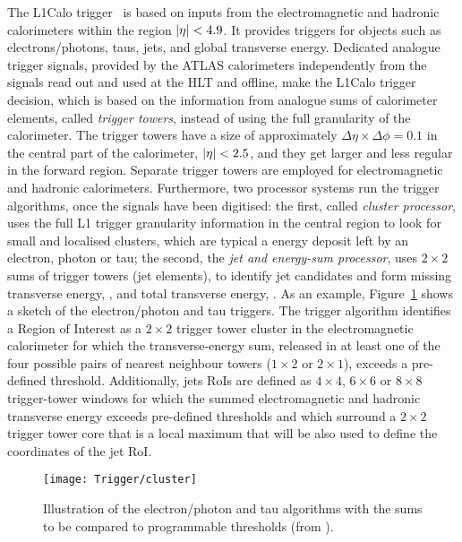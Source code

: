 			The \ac{L1Calo} trigger~\cite{ATLASJINST, ATLASL1CaloTrig} is based on inputs from the electromagnetic and hadronic calorimeters within the region $|\eta|<4.9$. It provides triggers for objects such as electrons/photons, taus, jets, and global transverse energy. Dedicated analogue trigger signals, provided by the \ac{ATLAS} calorimeters independently from the signals read out and used at the \ac{HLT} and offline, make the \ac{L1Calo} trigger decision, which is based on the information from analogue sums of calorimeter elements, called \emph{trigger towers}, instead of using the full granularity of the calorimeter. The trigger towers have a size of approximately $\Delta \eta \times \Delta \phi = 0.1$ in the central part of the calorimeter, $|\eta| < 2.5$, and they get larger and less regular in the forward region. Separate trigger towers are employed for electromagnetic and hadronic calorimeters. Furthermore, two processor systems run the trigger algorithms, once the signals have been digitised: the first, called \emph{cluster processor}, uses the full \ac{L1} trigger granularity information in the central region to look for small and localised clusters, which are typical a energy deposit left by an electron, photon or tau; the second, the \emph{jet and energy-sum processor}, uses $2 \times 2$ sums of trigger towers (jet elements), to identify jet candidates and form missing transverse energy, \met, and total transverse energy, \et. As an example, Figure~\ref{fig:calo_cluster} shows a sketch of the electron/photon and tau triggers. The trigger algorithm identifies a Region of Interest as a $2 \times 2$ trigger tower cluster in the electromagnetic calorimeter for which the transverse-energy sum, released in at least one of the four possible pairs of nearest neighbour towers ($1 \times 2$ or $2 \times 1$), exceeds a pre-defined threshold. Additionally, jets \ac{RoI}s are defined as $4 \times 4$, $6 \times 6$ or $8 \times 8$ trigger-tower windows for which the summed electromagnetic and hadronic transverse energy exceeds pre-defined thresholds and which surround a $2 \times 2$ trigger tower core that is a local maximum that will be also used to define the coordinates of the jet \ac{RoI}.

			\begin{figure}[!htb]
				\centering
				\texttt{[image: Trigger/cluster]}
				\caption{\label{fig:calo_cluster} Illustration of the electron/photon and tau algorithms with the sums to be compared to programmable thresholds (from \cite{ATLASTrigger2010}).}
			\end{figure}


